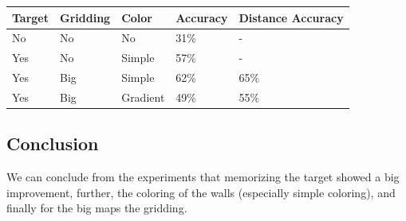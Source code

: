 \documentclass[a4paper]{article}
\begin{document}
\begin{center}
\begin{tabular}{| l | l | l | l | l |}
    \hline
    Target & Gridding & Color & Accuracy & Distance Accuracy \\ \hline
    No & No & No & 31\% & - \\ \hline
    Yes & No & Simple & 57\% & - \\ \hline
    Yes & Big& Simple & 62\% & 65\% \\ \hline
    Yes & Big & Gradient & 49\% & 55\% \\ \hline
    \end{tabular}
\end{center}

\subsection{Conclusion}
We can conclude from the experiments that memorizing the target showed a big improvement, further, the coloring of the walls (especially simple coloring), and finally for the big maps the gridding.









\end{document}
